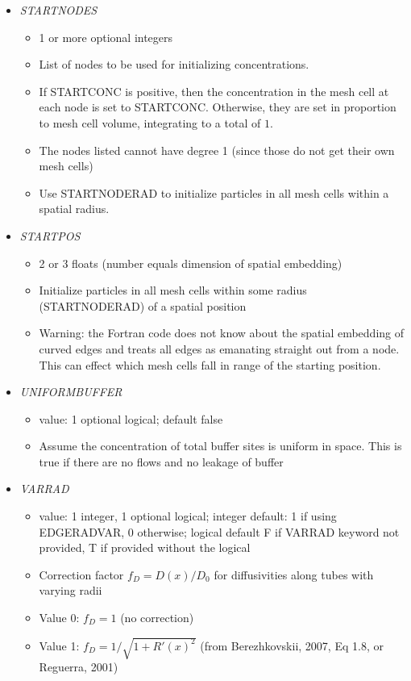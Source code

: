 \documentclass[12pt]{article}
\begin{document}
\begin{itemize}
%
\item {\it STARTNODES}
\begin{itemize}
	\item 1 or more optional integers
	\item List of nodes to be used for initializing concentrations.
	\item If STARTCONC is positive, then the concentration in the mesh cell at each node is set to STARTCONC. Otherwise, they are set in proportion to mesh cell volume, integrating to a total of $1$.
	\item The nodes listed cannot have degree 1 (since those do not get their own mesh cells)
	\item Use STARTNODERAD to initialize particles in all mesh cells within a spatial radius. 
\end{itemize}
%
\item {\it STARTPOS}
\begin{itemize}
	\item 2 or 3 floats (number equals dimension of spatial embedding)
	\item Initialize particles in all mesh cells within some radius (STARTNODERAD) of a spatial position
	\item {\color{red} Warning:} the Fortran code does not know about the spatial embedding of curved edges and treats all edges as emanating straight out from a node. This can effect which mesh cells fall in range of the starting position.
\end{itemize}
%
\item {\it UNIFORMBUFFER}
\begin{itemize}
	\item  value: 1 optional logical; default false
	\item Assume the concentration of total buffer sites is uniform in space. This is true if there are no flows and  no leakage of buffer
\end{itemize}
%
\item {\it VARRAD}
\begin{itemize}
	\item value: 1 integer, 1 optional logical; integer default: 1 if using EDGERADVAR, 0 otherwise; logical default F if VARRAD keyword not provided, T if provided without the logical
	\item Correction factor $f_D = D(x)/D_0$ for diffusivities along tubes with varying radii
	\item Value 0: $f_D = 1$ (no correction)
	\item Value 1: $f_D = 1/\sqrt{1 + R'(x)^2}$ (from Berezhkovskii, 2007, Eq 1.8, or Reguerra, 2001)

\end{itemize}
\end{itemize}
\end{document}
